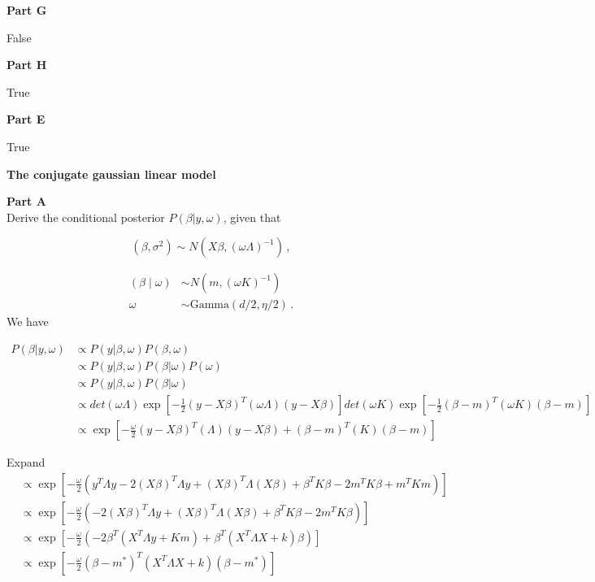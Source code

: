 \documentclass[12pt]{amsart}
\begin{document}
\bigskip
\bigskip
{\bf Part G} 

\bigskip
False
\bigskip
\bigskip

{\bf Part H} 

\bigskip
True
\bigskip
\bigskip

{\bf Part E} 

\bigskip
True

\bigskip
\bigskip

{\bf \large The conjugate gaussian linear model} 
\bigskip

\textbf{Part A}\\


Derive the conditional posterior $P(\beta|y, \omega)$, given that

$$
(\beta, \sigma^2) \sim N(X\beta, (\omega \Lambda)^{-1} ) \, ,
$$

\begin{align*}
(\beta \mid \omega) &\sim N(m, (\omega K)^{-1}) \\
\omega &\sim \mbox{Gamma}(d/2, \eta/2) \, .
\end{align*}
We have

\begin{align*}
    P(\beta|y, \omega) &\propto P(y|\beta, \omega)P(\beta, \omega)\\
    & \propto  P(y|\beta, \omega)P(\beta| \omega)P(\omega)\\
    & \propto  P(y|\beta, \omega)P(\beta| \omega)\\
    & \propto det(\omega \Lambda ) \exp[-\frac{1}{2}(y-X\beta)^T(\omega \Lambda)(y-X\beta)]  det(\omega K ) \exp[-\frac{1}{2}(\beta-m)^T(\omega K)(\beta-m)] \\
    &    \propto \exp[-\frac{\omega}{2}(y-X\beta)^T( \Lambda)(y-X\beta)+(\beta-m)^T(K)(\beta-m)] 
\end{align*}


Expand
\begin{align*}
   &    \propto \exp[-\frac{\omega}{2}(y^T\Lambda y -2(X\beta)^T\Lambda y + (X\beta)^T\Lambda(X\beta) + \beta^TK \beta -2m^TK\beta + m^TK m )] \\
   &    \propto  \exp[-\frac{\omega}{2}( -2(X\beta)^T\Lambda y + (X\beta)^T\Lambda(X\beta) + \beta^TK \beta -2m^TK\beta )] \\
   &    \propto  \exp[-\frac{\omega}{2}( -2\beta^T(X^T\Lambda y + Km)+\beta^T(X^T\Lambda X+k)\beta)] \\
   &    \propto  \exp[-\frac{\omega}{2}(\beta-m^*)^T(X^T\Lambda X+k)(\beta-m^*) ] \\
\end{align*}
\end{document}
